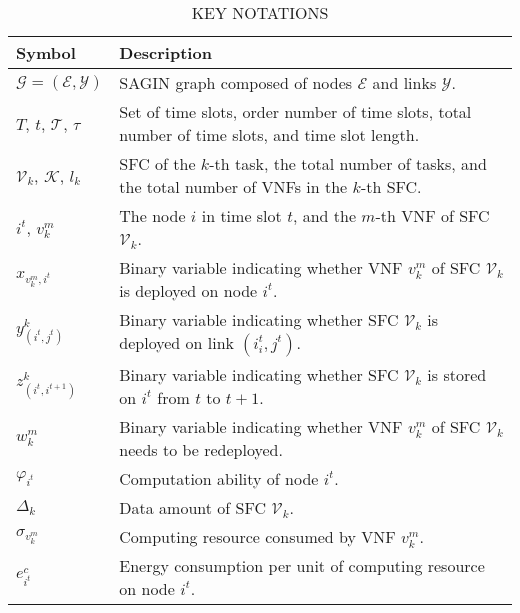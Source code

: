 \begin{table}[!t]
    \renewcommand\arraystretch{1.3}
	\begin{center}
		\caption{KEY NOTATIONS} \label{key notations}
		\begin{tabular}{|p{2cm}|p{6cm}|}
			\hline
			Symbol& Description \\
			\hline
            \hline
			$\mathcal{G} =(\mathcal{E},\mathcal{Y})$ & SAGIN graph composed of nodes $\mathcal{E}$ and links $\mathcal{Y}$.\\
            \hline
			$T$, $t$, $\mathscr{T}$, $\tau$ & Set of time slots, order number of time slots, total number of time slots, and time slot length.  \\
            \hline
            $\mathcal{V}_k$, $\mathcal{K}$, $l_k$ & SFC of the $k$-th task, the total number of tasks, and the total number of VNFs in the $k$-th SFC. \\
            \hline
            $i^t$, $v_k^m$ & The node $i$ in time slot $t$, and the $m$-th VNF of SFC $\mathcal{V}_k$. \\
			\hline
            $x_{v^m_k, i^t} $ & Binary variable indicating whether VNF $v^m_k$ of SFC $\mathcal{V}_k$ is deployed on node $i^t$.\\
            \hline
            $y^k_{(i^t,j^t)}$ & Binary variable indicating whether SFC $\mathcal{V}_k$ is deployed on link $(i^t_i,j^t)$.  \\
            \hline
            $z_{(i^t,i^{t+1})}^k $ & Binary variable indicating whether SFC $\mathcal{V}_k$ is stored on $i^t$ from $t$ to $t+1$.\\
            \hline
            $w^m_k$ & Binary variable indicating whether VNF $v^m_k$ of SFC $\mathcal{V}_k$ needs to be redeployed.\\
            \hline
            $\varphi _{i^t}$ & Computation ability of node $i^t$.\\
            \hline
            $\Delta_k$ & Data amount of SFC $\mathcal{V}_k$.\\
            \hline
            $\sigma _{v_k^m}$ & Computing resource consumed by VNF $v_k^m$.\\
            \hline
            $e^c_{i^t}$ & Energy consumption per unit of computing resource on node $i^t$.\\
            \hline
		\end{tabular}
	\end{center}
\end{table}

